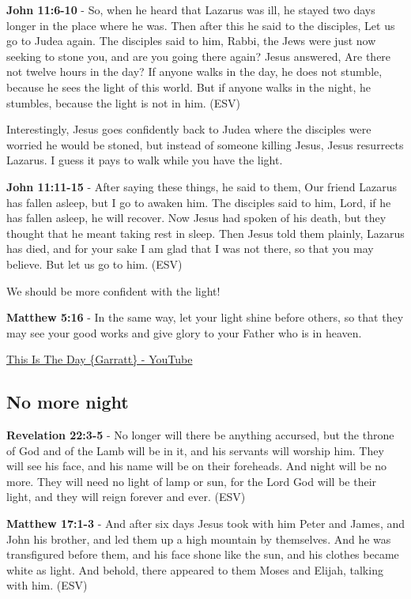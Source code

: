 \documentclass[11pt]{article}
\begin{document}
\textbf{John 11:6-10} - So, when he heard that Lazarus was ill, he stayed two days longer in the place where he was. Then after this he said to the disciples, Let us go to Judea again. The disciples said to him, Rabbi, the Jews were just now seeking to stone you, and are you going there again? Jesus answered, Are there not twelve hours in the day? If anyone walks in the day, he does not stumble, because he sees the light of this world. But if anyone walks in the night, he stumbles, because the light is not in him. (ESV)

Interestingly, Jesus goes confidently back to Judea where the disciples were worried he would be stoned, but instead of someone killing Jesus, Jesus resurrects Lazarus. I guess it pays to walk while you have the light.

\textbf{John 11:11-15} - After saying these things, he said to them, Our friend Lazarus has fallen asleep, but I go to awaken him. The disciples said to him, Lord, if he has fallen asleep, he will recover. Now Jesus had spoken of his death, but they thought that he meant taking rest in sleep. Then Jesus told them plainly, Lazarus has died, and for your sake I am glad that I was not there, so that you may believe. But let us go to him. (ESV)

We should be more confident with the light!

\textbf{Matthew 5:16} - In the same way, let your light shine before others, so that they may see your good works and give glory to your Father who is in heaven.

\href{https://www.youtube.com/watch?v=T9Eqm8uIuck}{This Is The Day \{Garratt\} - YouTube}

\subsection{No more night}
\label{sec:org4ec83f6}

\textbf{Revelation 22:3-5} -  No longer will there be anything accursed, but the throne of God and of the Lamb will be in it, and his servants will worship him.  They will see his face, and his name will be on their foreheads.  And night will be no more.  They will need no light of lamp or sun, for the Lord God will be their light, and they will reign forever and ever. (ESV)

\textbf{Matthew 17:1-3} -  And after six days Jesus took with him Peter and James, and John his brother, and led them up a high mountain by themselves.  And he was transfigured before them, and his face shone like the sun, and his clothes became white as light.  And behold, there appeared to them Moses and Elijah, talking with him.  (ESV)
\end{document}
